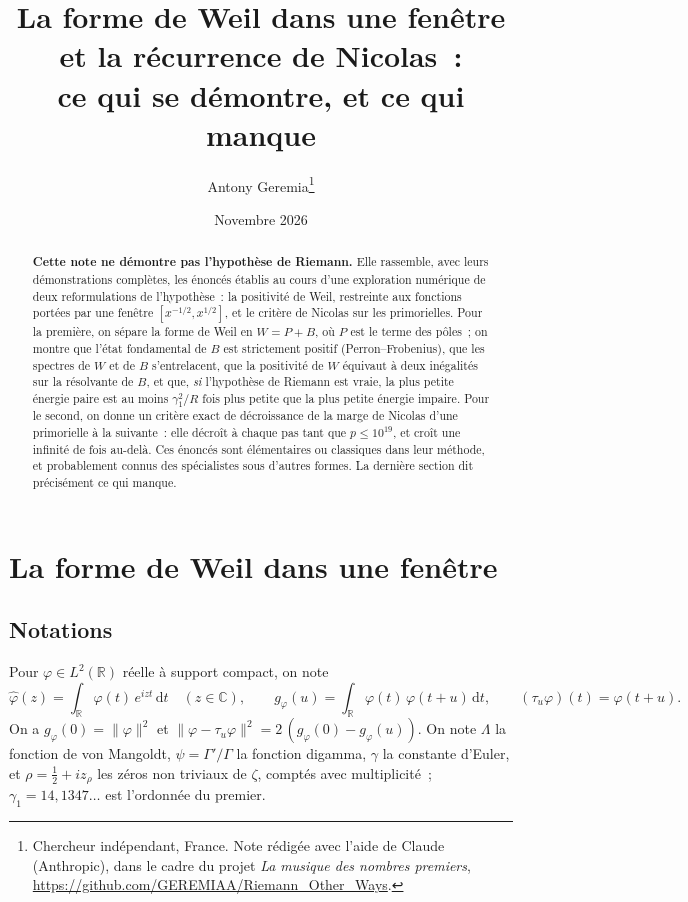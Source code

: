 \documentclass[11pt,a4paper]{article}
\title{La forme de Weil dans une fenêtre et la récurrence de Nicolas~:\\ ce qui se démontre, et ce qui manque}
\author{Antony Geremia\thanks{Chercheur indépendant, France. Note rédigée avec l'aide de Claude (Anthropic), dans le cadre du projet
\emph{La musique des nombres premiers}, \url{https://github.com/GEREMIAA/Riemann_Other_Ways}.}}
\date{Novembre 2026}
\theoremstyle{definition}
\theoremstyle{remark}
\newcommand{\R}{\mathbb{R}}
\newcommand{\dd}{\mathrm{d}}
\begin{document}
\maketitle

\begin{abstract}
\textbf{Cette note ne démontre pas l'hypothèse de Riemann.} Elle rassemble, avec leurs démonstrations complètes, les énoncés
établis au cours d'une exploration numérique de deux reformulations de l'hypothèse~: la positivité de Weil, restreinte aux
fonctions portées par une fenêtre $[x^{-1/2},x^{1/2}]$, et le critère de Nicolas sur les primorielles. Pour la première, on
sépare la forme de Weil en $W=P+B$, où $P$ est le terme des pôles~; on montre que l'état fondamental de $B$ est strictement
positif (Perron--Frobenius), que les spectres de $W$ et de $B$ s'entrelacent, que la positivité de $W$ équivaut à deux
inégalités sur la résolvante de $B$, et que, \emph{si} l'hypothèse de Riemann est vraie, la plus petite énergie paire est
au moins $\gamma_1^2/R$ fois plus petite que la plus petite énergie impaire. Pour le second, on donne un critère exact de
décroissance de la marge de Nicolas d'une primorielle à la suivante~: elle décroît à chaque pas tant que $p\le 10^{19}$, et
croît une infinité de fois au-delà. Ces énoncés sont élémentaires ou classiques dans leur méthode, et probablement connus
des spécialistes sous d'autres formes. La dernière section dit précisément ce qui manque.
\end{abstract}

\section{La forme de Weil dans une fenêtre}

\subsection*{Notations}
Pour $\varphi\in L^2(\R)$ réelle à support compact, on note
\[
\widehat\varphi(z)=\int_{\R}\varphi(t)\,e^{izt}\,\dd t\quad(z\in\mathbb{C}),\qquad
g_\varphi(u)=\int_{\R}\varphi(t)\,\varphi(t+u)\,\dd t,\qquad (\tau_u\varphi)(t)=\varphi(t+u).
\]
On a $g_\varphi(0)=\|\varphi\|^2$ et $\|\varphi-\tau_u\varphi\|^2=2\,(g_\varphi(0)-g_\varphi(u))$. On note $\Lambda$ la
fonction de von Mangoldt, $\psi=\Gamma'/\Gamma$ la fonction digamma, $\gamma$ la constante d'Euler, et
$\rho=\tfrac12+iz_\rho$ les zéros non triviaux de $\zeta$, comptés avec multiplicité~; $\gamma_1=14{,}1347\ldots$ est
l'ordonnée du premier.
\end{document}
